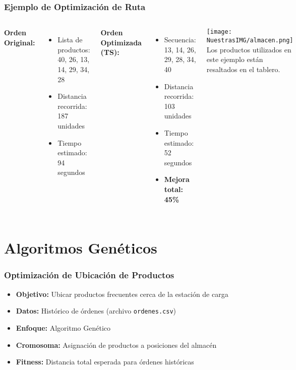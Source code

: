 \documentclass[aspectratio=169]{beamer}
\begin{document}
\begin{frame}
    \frametitle{Ejemplo de Optimización de Ruta}
    \begin{columns}
        \textbf{Orden Original:}
        \begin{itemize}
            \item Lista de productos: 40, 26, 13, 14, 29, 34, 28
            \item Distancia recorrida: 187 unidades
            \item Tiempo estimado: 94 segundos
        \end{itemize}
        \vspace{0.3cm}
        \textbf{Orden Optimizada (TS):}
        \begin{itemize}
            \item Secuencia: 13, 14, 26, 29, 28, 34, 40
            \item Distancia recorrida: 103 unidades
            \item Tiempo estimado: 52 segundos
            \item \textbf{Mejora total: 45\%}
        \end{itemize}
        
        \texttt{[image: NuestrasIMG/almacen.png]}
        \vspace{0.2cm}
        \small{Los productos utilizados en este ejemplo están resaltados en el tablero.}
    \end{columns}
\end{frame}




\section{Algoritmos Genéticos}

\begin{frame}
    \frametitle{Optimización de Ubicación de Productos}
    \begin{itemize}
        \item \textbf{Objetivo:} Ubicar productos frecuentes cerca de la estación de carga
        \item \textbf{Datos:} Histórico de órdenes (archivo \texttt{ordenes.csv})
        \item \textbf{Enfoque:} Algoritmo Genético
        \item \textbf{Cromosoma:} Asignación de productos a posiciones del almacén
        \item \textbf{Fitness:} Distancia total esperada para órdenes históricas
    \end{itemize}
\end{frame}
\end{document}
